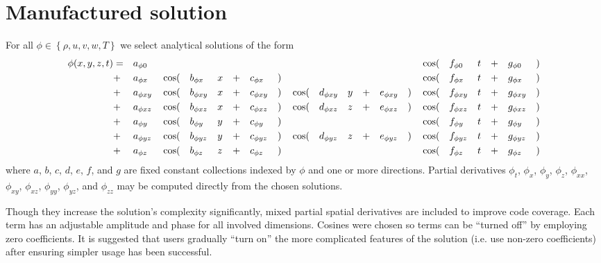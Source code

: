 \documentclass[10pt,reqno]{amsart}
\begin{document}
\section{Manufactured solution}

For all $\phi\in\left\{\rho, u, v, w, T\right\}$ we select analytical solutions
of the form
\begin{alignat}{20}
\label{eq:solution}
  \phi\!\left(x, y, z, t\right)
&= &&a_{\phi{}0}  &&     &&             &&  &&  &&            &&  &&     &&             &&  &&  &&            &&   &&\cos(&&f_{\phi{}0 } &&t &&+ &&g_{\phi{}0 }&&)       \\
&+ &&a_{\phi{}x } &&\cos(&&b_{\phi{}x } &&x &&+ &&c_{\phi{}x }&&) &&     &&             &&  &&  &&            &&   &&\cos(&&f_{\phi{}x } &&t &&+ &&g_{\phi{}x }&&) \notag\\
&+ &&a_{\phi{}xy} &&\cos(&&b_{\phi{}xy} &&x &&+ &&c_{\phi{}xy}&&) &&\cos(&&d_{\phi{}xy} &&y &&+ &&e_{\phi{}xy}&&)  &&\cos(&&f_{\phi{}xy} &&t &&+ &&g_{\phi{}xy}&&) \notag\\
&+ &&a_{\phi{}xz} &&\cos(&&b_{\phi{}xz} &&x &&+ &&c_{\phi{}xz}&&) &&\cos(&&d_{\phi{}xz} &&z &&+ &&e_{\phi{}xz}&&)  &&\cos(&&f_{\phi{}xz} &&t &&+ &&g_{\phi{}xz}&&) \notag\\
&+ &&a_{\phi{}y } &&\cos(&&b_{\phi{}y } &&y &&+ &&c_{\phi{}y }&&) &&     &&             &&  &&  &&            &&   &&\cos(&&f_{\phi{}y } &&t &&+ &&g_{\phi{}y }&&) \notag\\
&+ &&a_{\phi{}yz} &&\cos(&&b_{\phi{}yz} &&y &&+ &&c_{\phi{}yz}&&) &&\cos(&&d_{\phi{}yz} &&z &&+ &&e_{\phi{}yz}&&)  &&\cos(&&f_{\phi{}yz} &&t &&+ &&g_{\phi{}yz}&&) \notag\\
&+ &&a_{\phi{}z } &&\cos(&&b_{\phi{}z } &&z &&+ &&c_{\phi{}z }&&) &&     &&             &&  &&  &&            &&   &&\cos(&&f_{\phi{}z } &&t &&+ &&g_{\phi{}z }&&) \notag
\end{alignat}
where $a$, $b$, $c$, $d$, $e$, $f$, and $g$ are fixed constant collections
indexed by $\phi$ and one or more directions.  Partial derivatives $\phi_{t }$,
$\phi_{x }$, $\phi_{y }$, $\phi_{z }$, $\phi_{xx}$, $\phi_{xy}$, $\phi_{xz}$,
$\phi_{yy}$, $\phi_{yz}$, and $\phi_{zz}$ may be computed directly from the
chosen solutions.

Though they increase the solution's complexity significantly, mixed partial
spatial derivatives are included to improve code coverage.  Each term has an
adjustable amplitude and phase for all involved dimensions.  Cosines were
chosen so terms can be ``turned off'' by employing zero coefficients. It is
suggested that users gradually ``turn on'' the more complicated features of the
solution (i.e. use non-zero coefficients) after ensuring simpler usage has been
successful.
\end{document}
